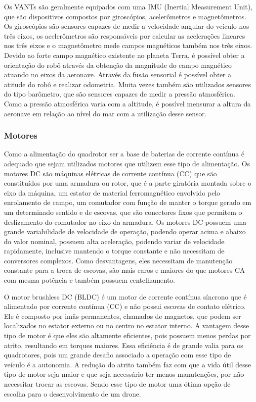 Os VANTs são geralmente equipados com uma IMU (Inertial Measurement Unit), que são dispositivos compostos por giroscópios, acelerômetros e magnetômetros. Os giroscópios são sensores capazes de medir a velocidade angular do veículo nos três eixos, os acelerômetros são responsáveis por calcular as acelerações lineares nos três eixos e o magnetômetro mede campos magnéticos também nos três eixos. Devido ao forte campo magnético existente no planeta Terra, é possível obter a orientação do robô através da obtenção da magnitude do campo magnético atuando no eixos da aeronave. Através da fusão sensorial é possível obter a atitude do robô e realizar odometria. Muita vezes também são utilizados sensores do tipo barômetro, que são sensores capazes de medir a pressão atmosférica. Como a pressão atmosférica varia com a altitude, é possível mensurar a altura da aeronave em relação ao nível do mar com a utilização desse sensor.

\subsubsection{Motores}


Como a alimentação do quadrotor ser a base de baterias de corrente contínua é adequado que sejam utilizados motores que utilizem esse tipo de alimentação. Os motores DC são máquinas elétricas de corrente contínua (CC) que são constituídos por uma armadura ou rotor, que é a parte giratória montada sobre o eixo da máquina, um estator de material ferromagnético envolvido pelo enrolamento de campo, um comutador com função de manter o torque gerado em um determinado sentido e de escovas, que são conectores fixos que permitem o deslizamento do comutador no eixo da armadura. Os motores DC possuem uma grande variabilidade de velocidade de operação, podendo operar acima e abaixo do valor nominal, possuem alta aceleração, podendo variar de velocidade rapidamente, inclusive mantendo o torque constante e não necessitam de conversores complexos. Como desvantagens, eles necessitam de manutenção constante para a troca de escovas, são mais caros e maiores do que motores CA com mesma potência e também possuem centelhamento.

O motor brushless DC (BLDC) é um motor de corrente contínua síncrono que é alimentado por corrente contínua (CC) e não possui escovas de contato elétrico. Ele é composto por imãs permanentes, chamados de magnetos, que podem ser localizados no estator externo ou no centro no estator interno. A vantagem desse tipo de motor é que eles são altamente eficientes, pois possuem menos perdas por atrito, resultando em torques maiores. Essa eficiência é de grande valia para os quadrotores, pois um grande desafio associado a operação com esse tipo de veículo é a autonomia. A redução do atrito também faz com que a vida útil desse tipo de motor seja maior e que seja necessário ter menos manutenções, por não necessitar trocar as escovas. Sendo esse tipo de motor uma ótima opção de escolha para o desenvolvimento de um drone.

